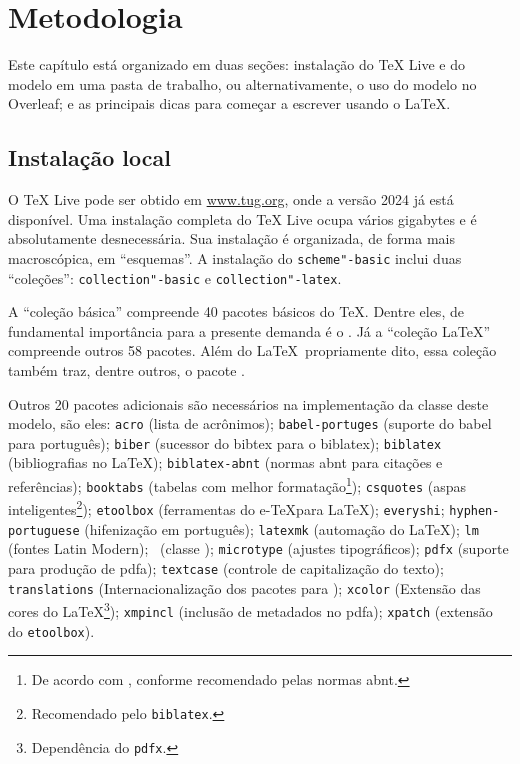 \chapter{Metodologia}

Este capítulo está organizado em duas seções: instalação do TeX Live e  do modelo em uma pasta de trabalho, ou alternativamente, o uso do modelo no Overleaf; e as principais dicas para começar a escrever usando o \LaTeX.

\section{Instalação local}

O TeX Live pode ser obtido em \url{www.tug.org}, onde a versão 2024 já está disponível. Uma instalação completa do TeX Live ocupa vários gigabytes e é absolutamente desnecessária. Sua instalação é organizada, de forma mais macroscópica, em \enquote{esquemas}. A instalação do \texttt{scheme"-basic} inclui duas \enquote{coleções}: \texttt{collection"-basic} e \texttt{collection"-latex}.

A \enquote{coleção básica} compreende 40 pacotes básicos do \TeX. Dentre eles, de fundamental importância para a presente demanda é o \pdftex. Já a \enquote{coleção \LaTeX} compreende outros 58 pacotes. Além do \LaTeX\ propriamente dito, essa coleção também traz, dentre outros, o pacote \babel.

Outros 20 pacotes adicionais são necessários na implementação da classe deste modelo, são eles:
\texttt{acro} (lista de acrônimos);
\texttt{babel-portuges} (suporte do babel para português);
\texttt{biber} (sucessor do bibtex para o biblatex);
\texttt{biblatex} (bibliografias no \LaTeX);
\texttt{biblatex-abnt} (normas \ac{abnt} para citações e referências);
\texttt{booktabs} (tabelas com melhor formatação\footnote{De acordo com \cite{ibge1993}, conforme recomendado pelas normas \ac{abnt}.});
\texttt{csquotes} (aspas inteligentes\footnote{Recomendado pelo \texttt{biblatex}.});
\texttt{etoolbox} (ferramentas do e-\TeX para \LaTeX);
\texttt{everyshi};
\texttt{hyphen-portuguese} (hifenização em português);
\texttt{latexmk} (automação do \LaTeX);
\texttt{lm} (fontes Latin Modern);
\memoir\ (classe \memoir);
\texttt{microtype} (ajustes tipográficos);
\texttt{pdfx} (suporte para produção de \ac{pdfa});
\texttt{textcase} (controle de capitalização do texto);
\texttt{translations} (Internacionalização dos pacotes para \LaTeXe);
\texttt{xcolor} (Extensão das cores do \LaTeX\footnote{Dependência do \texttt{pdfx}.});
\texttt{xmpincl} (inclusão de metadados no \ac{pdfa});
\texttt{xpatch} (extensão do \texttt{etoolbox}).


